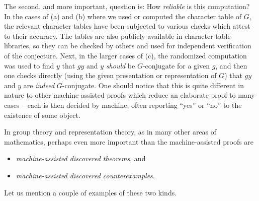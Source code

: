 The second, and more important, question is: How {\it reliable} is this computation? In the cases of (a) and (b) where we used or computed the character table of $G$,  the relevant character tables have been subjected to various checks which attest to their accuracy.  The tables are also publicly available in character table libraries, so they can be checked by others and used for independent verification of the conjecture. 
Next, in the larger cases of (c), the randomized computation was used to find $y$ that $gy$ and $y$ {\it should} be $G$-conjugate for
a given $g$, and then one checks directly (using the given presentation or representation of $G$) that $gy$ and $y$ are {\it indeed}
$G$-conjugate. One should notice that this is quite different in nature to other machine-assisted proofs which reduce an elaborate proof to many cases -- each is then decided by machine, often reporting ``yes'' or ``no'' to the existence of some object.

\bigskip
In group theory and representation theory, as in many other areas of mathematics, perhaps even more important than 
the machine-assisted proofs are

\begin{itemize}
\item {\it machine-assisted discovered theorems}, and  
\item {\it machine-assisted discovered counterexamples}.
\end{itemize}
Let us mention a couple of examples of these two kinds.

